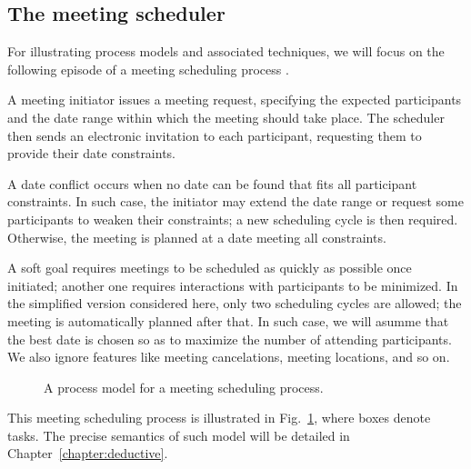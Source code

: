 \subsection{The meeting scheduler\label{subsection:background-meeting-scheduler}}

For illustrating process models and associated techniques, we will focus on the following episode of a meeting scheduling process \cite{Feather:1997}. 

A meeting initiator issues a meeting request, specifying the expected participants and the date range within which the meeting should take place. The scheduler then sends an electronic invitation to each participant, requesting them to provide their date constraints. 

A date conflict occurs when no date can be found that fits all participant constraints. In such case, the initiator may extend the date range or request some participants to weaken their constraints; a new scheduling cycle is then required. Otherwise, the meeting is planned at a date meeting all constraints.

A soft goal requires meetings to be scheduled as quickly as possible once initiated; another one requires interactions with participants to be minimized. In the simplified version considered here, only two scheduling cycles are allowed; the meeting is automatically planned after that. In such case, we will asumme that the best date is chosen so as to maximize the number of attending participants. We also ignore features like meeting cancelations, meeting locations, and so on.

\begin{figure}[H]\centering
{}
\caption{A process model for a meeting scheduling process.\label{image:scheduler-ghmsc}}
\end{figure}

This meeting scheduling process is illustrated in Fig.~\ref{image:scheduler-ghmsc}, where boxes denote tasks. The precise semantics of such model will be detailed in Chapter~\ref{chapter:deductive}.

